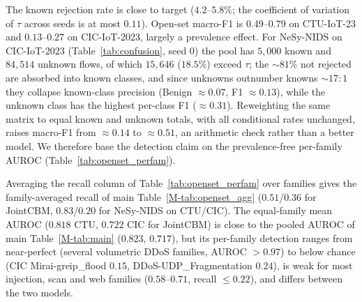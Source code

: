\documentclass[journal]{IEEEtran}
\begin{document}
The known rejection rate is close to target ($4.2$--$5.8\%$; the coefficient of variation of $\tau$
across seeds is at most $0.11$). Open-set macro-F1 is $0.49$--$0.79$ on CTU-IoT-23 and $0.13$--$0.27$
on CIC-IoT-2023, largely a prevalence effect. For NeSy-NIDS on CIC-IoT-2023 (Table~\ref{tab:confusion},
seed 0) the pool has $5{,}000$ known and $84{,}514$ unknown flows, of which $15{,}646$ ($18.5\%$)
exceed $\tau$; the ${\sim}81\%$ not rejected are absorbed into known classes, and since unknowns
outnumber knowns ${\sim}17{:}1$ they collapse known-class precision (Benign $\approx0.07$, F1
$\approx0.13$), while the unknown class has the highest per-class F1 ($\approx0.31$). Reweighting the
same matrix to equal known and unknown totals, with all conditional rates unchanged, raises macro-F1
from $\approx0.14$ to $\approx0.51$, an arithmetic check rather than a better model. We therefore base
the detection claim on the prevalence-free per-family AUROC (Table~\ref{tab:openset_perfam}).

\begin{table}[!htb]
\centering\footnotesize
\caption{$(C{+}1)$ confusion matrix, NeSy-NIDS on CIC-IoT-2023 (seed 0; row $=$ true,
column $=$ predicted). All 29 held-out families are merged into the single
``unknown/reject'' row. VulnSc.: VulnerabilityScan.}
\label{tab:confusion}
\setlength{\tabcolsep}{3pt}
\end{table}

Averaging the recall column of Table~\ref{tab:openset_perfam} over families gives the
family-averaged recall of main Table~\ref{M-tab:openset_agg} ($0.51$/$0.36$ for JointCBM,
$0.83$/$0.20$ for NeSy-NIDS on CTU/CIC). The equal-family mean AUROC ($0.818$ CTU, $0.722$ CIC for
JointCBM) is close to the pooled AUROC of main Table~\ref{M-tab:main} ($0.823$, $0.717$), but
its per-family detection ranges from near-perfect (several volumetric DDoS families, AUROC $>0.97$) to
below chance (CIC Mirai-greip\_flood $0.15$, DDoS-UDP\_Fragmentation $0.24$), is weak for most
injection, scan and web families ($0.58$--$0.71$, recall ${\le}0.22$), and differs between the two
models.
\end{document}
